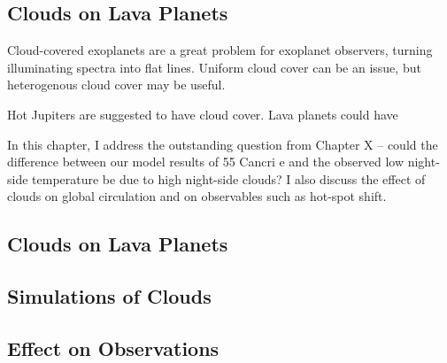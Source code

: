 \begin{SingleSpace}
\chapter{Clouds on Lava Planets}
\vspace{0.5cm}
\end{SingleSpace}
\vspace{0.5cm}






Cloud-covered exoplanets are a great problem for exoplanet observers, turning illuminating spectra into flat lines. Uniform cloud cover can be an issue, but heterogenous cloud cover may be useful.



Hot Jupiters are suggested to have cloud cover. Lava planets could have



In this chapter, I address the outstanding question from Chapter X -- could the difference between our model results of 55 Cancri e and the observed low night-side temperature be due to high night-side clouds? I also discuss the effect of clouds on global circulation and on observables such as hot-spot shift.


\section{Clouds on Lava Planets}






\section{Simulations of Clouds}






\section{Effect on Observations}







